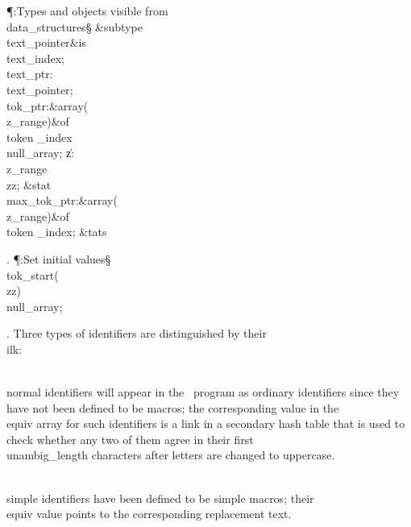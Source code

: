 \Y\P\?\4:Types and objects visible from \\{data\_structures}\X\mathrel{+}\S%
\?\6
\&{subtype}\8\\{text\_pointer}\8\&{is}\8\\{text\_index};\7
\\{text\_ptr}\?:\?\\{text\_pointer}\?\K{};\6
\\{tok\_ptr}\?:\1\&{array}\8\1(\?\\{z\_range}\?\2)\2\8\&{of}\?\8\\{token%
\_index}\?\K\?\\{null\_array};\6
\|z\?:\?\\{z\_range}\?\K{}\?\?\\{zz};\6
\&{stat}\1\6
\\{max\_tok\_ptr}\?:\1\&{array}\8\1(\?\\{z\_range}\?\2)\2\8\&{of}\?\8\\{token%
\_index};\2\6
\&{tats}\par
\fi

. \P\?:Set initial values\X\mathrel{+}\S\?\6
\\{tok\_start}\?\1(\?\to\?\\{zz}\?\2)\K\?\\{null\_array};\par
\fi

. Three types of identifiers are distinguished by their \\{ilk}:

\yskip\hang \\{normal} identifiers will appear in the \ADA\ program as
ordinary identifiers since they have not been defined to be macros; the
corresponding value in the \\{equiv} array for such identifiers is a link in a
secondary hash table that is used to check whether any two of them agree in
their first \\{unambig\_length} characters after letters are changed to
uppercase.

\yskip\hang \\{simple} identifiers have been defined to be simple macros;
their \\{equiv} value points to the corresponding replacement text.

